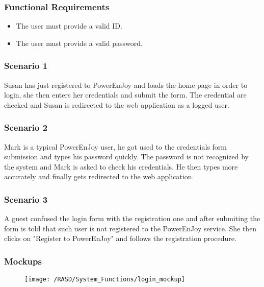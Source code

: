 \subsubsection{Functional Requirements}
\begin{itemize}
  \item The user must provide a valid ID.
  \item The user must provide a valid password.
\end{itemize}

\subsubsection{Scenario 1}
Susan has just registered to PowerEnJoy and loads the home page in order to login, she then enters her credentials and submit the form. The credential are checked and Susan is redirected to the web application as a logged user.

\subsubsection{Scenario 2}
Mark is a typical PowerEnJoy user, he got used to the credentials form submission and types his password quickly. The password is not recognized by the system and Mark is asked to check his credentials. He then types more accurately and finally gets redirected to the web application. %

\subsubsection{Scenario 3}
A guest confused the login form with the registration one and after submiting the form is told that such user is not registered to the PowerEnJoy service. She then clicks on "Register to PowerEnJoy" and follows the registration procedure.


\subsubsection{Mockups}
\begin{figure}[!ht]
  \centering
  \vspace{0.2cm}
  \texttt{[image: /RASD/System\_Functions/login\_mockup]}\\
  \vspace{0.4cm}
  \label{fig:login_mockup} 
\end{figure}


